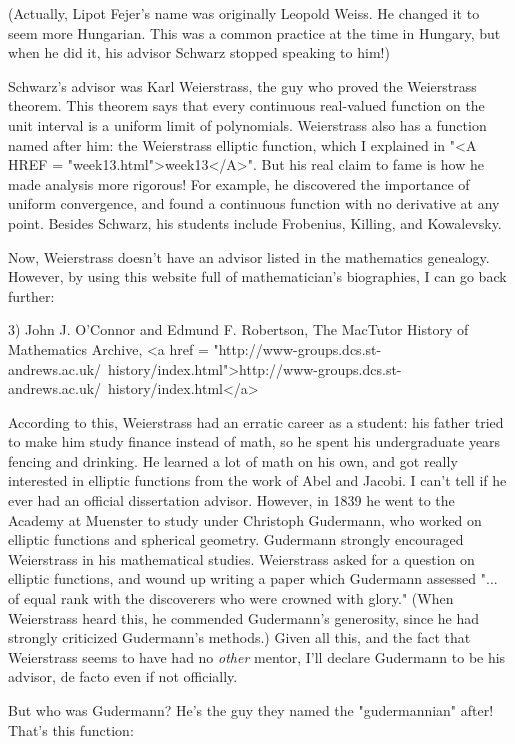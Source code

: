 (Actually, Lipot Fejer's name was originally Leopold Weiss.  He changed
it to seem more Hungarian.  This was a common practice at the time in 
Hungary, but when he did it, his advisor Schwarz stopped speaking to him!)

Schwarz's advisor was Karl Weierstrass, the guy who proved the Weierstrass 
theorem.  This theorem says that every continuous real-valued function
on the unit interval is a uniform limit of polynomials.  Weierstrass
also has a function named after him: the Weierstrass elliptic function,
which I explained in "<A HREF = "week13.html">week13</A>".  But his real claim to fame is how he
made analysis more rigorous!  For example, he discovered the importance
of uniform convergence, and found a continuous function with no derivative 
at any point.   Besides Schwarz, his students include Frobenius, Killing,
and Kowalevsky.

Now, Weierstrass doesn't have an advisor listed in the mathematics
genealogy.  However, by using this website full of mathematician's
biographies, I can go back further:

3) John J. O'Connor and Edmund F. Robertson, The MacTutor History of
Mathematics Archive, 
<a href = "http://www-groups.dcs.st-andrews.ac.uk/~history/index.html">http://www-groups.dcs.st-andrews.ac.uk/~history/index.html</a>

According to this, Weierstrass had an erratic career as a student: his
father tried to make him study finance instead of math, so he spent
his undergraduate years fencing and drinking.  He learned a lot of
math on his own, and got really interested in elliptic functions from
the work of Abel and Jacobi.  I can't tell if he ever had an official
dissertation advisor.  However, in 1839 he went to the Academy at
Muenster to study under Christoph Gudermann, who worked on elliptic 
functions and spherical geometry.  Gudermann strongly encouraged 
Weierstrass in his mathematical studies.  Weierstrass asked for a
question on elliptic functions, and wound up writing a paper which
Gudermann assessed "... of equal rank with the discoverers who were
crowned with glory."  (When Weierstrass heard this, he commended
Gudermann's generosity, since he had strongly criticized 
Gudermann's methods.)
Given all this, and the fact that Weierstrass seems 
to have had no \emph{other} mentor, I'll declare Gudermann to be his 
advisor, de facto even if not officially.

But who was Gudermann?  He's the guy they named the "gudermannian" 
after!  That's this function:

